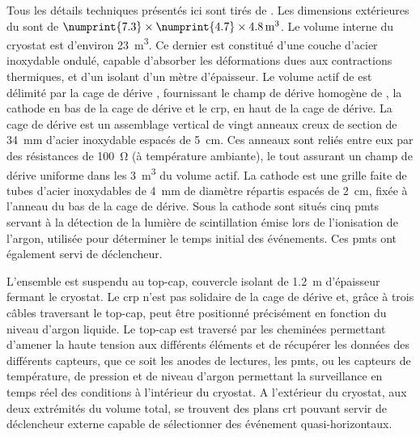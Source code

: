       Tous les détails techniques présentés ici sont tirés de \cite{Aimard2018}. Les dimensions extérieures du \TOO{} sont de $\numprint{7.3}\times\numprint{4.7}\times\SI{4.8}{\meter\cubed}$. Le volume interne du cryostat
      est d'environ \SI{23}{\meter\cubed}. Ce dernier est constitué d'une couche d'acier inoxydable ondulé, capable d'absorber les déformations dues aux contractions thermiques, et d'un isolant d'un mètre d'épaisseur. Le volume actif de \TOO{} est délimité par la cage de dérive , fournissant le champ de dérive homogène de \driftfield{}, la cathode en bas de la cage de dérive et le \gls{crp}, en haut de la cage de dérive. La cage de dérive est un assemblage vertical de vingt anneaux creux de section de \SI{34}{\milli\meter} d'acier inoxydable espacés de \SI{5}{\centi\meter}. Ces anneaux sont reliés entre eux par des résistances de \SI{100}{\ohm} (à température ambiante), le tout assurant un champ de dérive uniforme dans les \SI{3}{\meter\cubed} du volume actif. La cathode est une grille faite de tubes d'acier inoxydables de \SI{4}{\milli\meter} de diamètre répartis espacés de \SI{2}{\centi\meter}, fixée à l'anneau du bas de la cage de dérive. Sous la cathode sont situés cinq \glspl{pmt} servant à la détection de la lumière de scintillation émise lors de l'ionisation de l'argon, utilisée pour déterminer le temps initial des événements. Ces \glspl{pmt} ont également servi de déclencheur. 

      L'ensemble est suspendu au top-cap, couvercle isolant de \SI{1.2}{\meter} d'épaisseur fermant le cryostat. Le \gls{crp} n'est pas solidaire de la cage de dérive et, grâce à trois câbles traversant le top-cap, peut être positionné précisément en fonction du niveau d'argon liquide. Le top-cap est traversé par les cheminées permettant d'amener la haute tension aux différents éléments et de récupérer les données des différents capteurs, que ce soit les anodes de lectures, les \glspl{pmt}, ou les capteurs de température, de pression et de niveau d'argon permettant la surveillance en temps réel des conditions à l'intérieur du cryostat. A l'extérieur du cryostat, aux deux extrémités du volume total, se trouvent des plans \gls{crt} pouvant servir de déclencheur externe capable de sélectionner des événement quasi-horizontaux.

